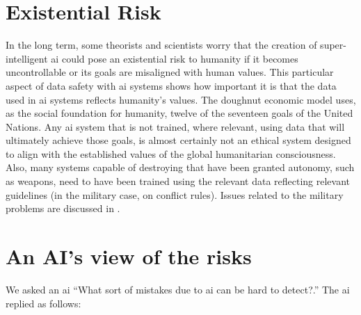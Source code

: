 \section{Existential Risk}
In the long term, some theorists and scientists worry that the creation of super-intelligent \gls{ai} could pose an existential risk to humanity if it becomes uncontrollable or its goals are misaligned with human values. This particular aspect of data safety with \gls{ai} systems shows how important it is that the data used in \gls{ai} systems reflects humanity's values. The doughnut economic model uses, as the social foundation for humanity, twelve of the seventeen goals of the United Nations. Any \gls{ai} system that is not trained, where relevant, using data that will ultimately achieve those goals, is almost certainly not an ethical system designed to align with the established values of the global humanitarian consciousness. Also, many systems capable of destroying that have been granted autonomy, such as  weapons, need to have been trained using the relevant data reflecting relevant guidelines (in the military case, on conflict rules). Issues related to the military problems are discussed in \cite{citation:SCSC152}.

\section{An AI's view of the risks}
We asked an \gls{ai} ``What sort of mistakes due to \gls{ai} can be hard to detect?.'' The \gls{ai} replied as follows:

